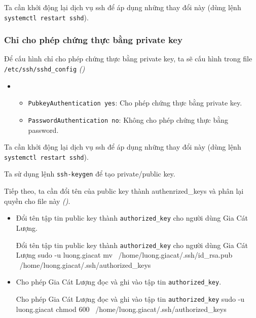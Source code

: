 Ta cần khởi động lại dịch vụ ssh để áp dụng những thay đổi này (dùng lệnh \texttt{systemctl restart sshd}).

\subsubsection{Chỉ cho phép chứng thực bằng private key}

Để cấu hình chỉ cho phép chứng thực bằng private key, ta sẽ cấu hình trong file \texttt{/etc/ssh/sshd\_config} \textit{()}


\begin{itemize}[label={}]
  \item
        \begin{itemize}[label={--}]
          \item \texttt{PubkeyAuthentication yes}: Cho phép chứng thực bằng private key.
          \item \texttt{PasswordAuthentication no}: Không cho phép chứng thực bằng password.
        \end{itemize}
\end{itemize}

Ta cần khởi động lại dịch vụ ssh để áp dụng những thay đổi này (dùng lệnh \texttt{systemctl restart sshd}).

Ta sử dụng lệnh \texttt{ssh-keygen} để tạo private/public key.


Tiếp theo, ta cần đổi tên của public key thành authenrized\_keys và phân lại quyền
cho file này \textit{()}.




\begin{itemize}[label={--}]
  \item Đổi tên tập tin public key thành \texttt{authorized\_key} cho người dùng Gia Cát Lượng.\\
        \begin{coding}[gobble=10]{Đổi tên tập tin public key thành \texttt{authorized\_key} cho người dùng Gia Cát Lượng}
          sudo -u luong.giacat mv \ /home/luong.giacat/.ssh/id_rsa.pub \ /home/luong.giacat/.ssh/authorized_keys
        \end{coding}

  \item Cho phép Gia Cát Lượng đọc và ghi vào tập tin \texttt{authorized\_key}.\\
        \begin{coding}[gobble=10]{Cho phép Gia Cát Lượng đọc và ghi vào tập tin \texttt{authorized\_key}}
          sudo -u luong.giacat chmod 600 \ /home/luong.giacat/.ssh/authorized_keys
        \end{coding}
\end{itemize}



